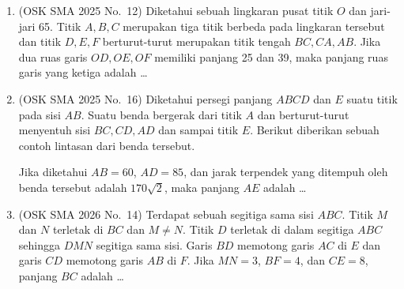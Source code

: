 \documentclass[12pt,a4paper]{article}
\begin{document}
\begin{enumerate}
\item (OSK SMA 2025 No.\ 12) Diketahui sebuah lingkaran pusat titik $O$ dan jari-jari 65. Titik $A, B, C$ merupakan tiga titik berbeda pada lingkaran tersebut dan titik $D, E, F$ berturut-turut merupakan titik tengah $BC, CA, AB$. Jika dua ruas garis $OD, OE, OF$ memiliki panjang 25 dan 39, maka panjang ruas garis yang ketiga adalah \dots

\item (OSK SMA 2025 No.\ 16) Diketahui persegi panjang $ABCD$ dan $E$ suatu titik pada sisi $AB$. Suatu benda bergerak dari titik $A$ dan berturut-turut menyentuh sisi $BC, CD, AD$ dan sampai titik $E$. Berikut diberikan sebuah contoh lintasan dari benda tersebut.

\begin{center}
\end{center}

Jika diketahui $AB=60$, $AD=85$, dan jarak terpendek yang ditempuh oleh benda tersebut adalah $170\sqrt{2}$, maka panjang $AE$ adalah \dots

\item (OSK SMA 2026 No.\ 14) Terdapat sebuah segitiga sama sisi $ABC$. Titik $M$ dan $N$ terletak di $BC$ dan $M\ne N$. Titik $D$ terletak di dalam segitiga $ABC$ sehingga $DMN$ segitiga sama sisi. Garis $BD$ memotong garis $AC$ di $E$ dan garis $CD$ memotong garis $AB$ di $F$. Jika $MN=3$, $BF=4$, dan $CE=8$, panjang $BC$ adalah \dots


\end{enumerate}
\end{document}
